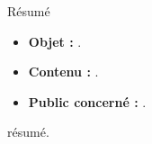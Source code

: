 \begin{center}
\Large
Résumé
\normalsize
\end{center}
\vspace{3cm}
\begin{itemize}[leftmargin=1cm, label=, itemsep=21pt]
\item {\bf Objet : } .
\item {\bf Contenu : } .
\item {\bf Public concerné : } .
\end{itemize}

\vspace{3cm}

résumé.

\vspace{3cm}

